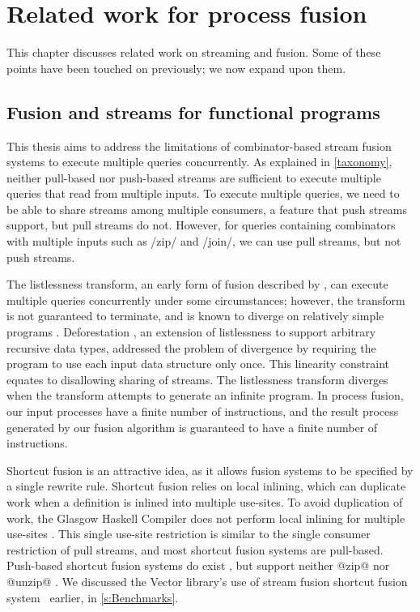 \chapter{Related work for process fusion}
\label{related}

This chapter discusses related work on streaming and fusion.
Some of these points have been touched on previously; we now expand upon them.

\section{Fusion and streams for functional programs}
\label{related/fusion}
\label{related/stream-fusion}

This thesis aims to address the limitations of combinator-based stream fusion systems to execute multiple queries concurrently.
As explained in \cref{taxonomy}, neither pull-based nor push-based streams are sufficient to execute multiple queries that read from multiple inputs.
To execute multiple queries, we need to be able to share streams among multiple consumers, a feature that push streams support, but pull streams do not.
However, for queries containing combinators with multiple inputs such as \Hs/zip/ and \Hs/join/, we can use pull streams, but not push streams.

The listlessness transform, an early form of fusion described by \citet{wadler1984listlessness}, can execute multiple queries concurrently under some circumstances; however, the transform is not guaranteed to terminate, and is known to diverge on relatively simple programs \citep{caspi1996synchronous}.
Deforestation \citep{wadler1990deforestation}, an extension of listlessness to support arbitrary recursive data types, addressed the problem of divergence by requiring the program to use each input data structure only once.
This linearity constraint equates to disallowing sharing of streams.
The listlessness transform diverges when the transform attempts to generate an infinite program.
In process fusion, our input processes have a finite number of instructions, and the result process generated by our fusion algorithm is guaranteed to have a finite number of instructions.

Shortcut fusion is an attractive idea, as it allows fusion systems to be specified by a single rewrite rule.
Shortcut fusion relies on local inlining, which can duplicate work when a definition is inlined into multiple use-sites.
To avoid duplication of work, the Glasgow Haskell Compiler does not perform local inlining for multiple use-sites \citep{jones1998transformation}.
This single use-site restriction is similar to the single consumer restriction of pull streams, and most shortcut fusion systems are pull-based.
Push-based shortcut fusion systems do exist \cite{gill1993short}, but support neither @zip@ nor @unzip@ \cite{svenningsson2002shortcut,lippmeier2013data}.
We discussed the Vector library's use of stream fusion shortcut fusion system~\cite{coutts2007stream} earlier, in \cref{s:Benchmarks}.

